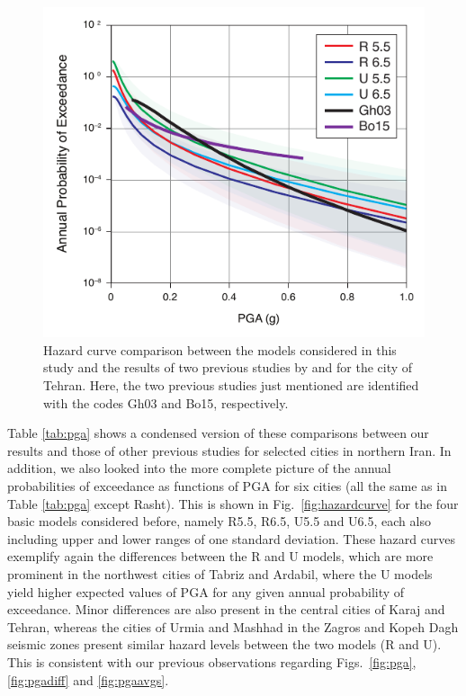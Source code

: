 \begin{figure}[t]
    \centering
    \includegraphics[width=\columnwidth]{figures/pdf/figure-13} 
    \caption{Hazard curve comparison between the models considered in this study and the results of two previous studies by \citet{Ghodrati2003} and \citet{Boostan2015} for the city of Tehran. Here, the two previous studies just mentioned are identified with the codes Gh03 and Bo15, respectively.}
    \label{fig:tehran}
\end{figure}

Table \ref{tab:pga} shows a condensed version of these comparisons between our results and those of other previous studies for selected cities in northern Iran. In addition, we also looked into the more complete picture of the annual probabilities of exceedance as functions of PGA for six cities (all the same as in Table \ref{tab:pga} except Rasht). This is shown in Fig.~\ref{fig:hazardcurve} for the four basic models considered before, namely R5.5, R6.5, U5.5 and U6.5, each also including upper and lower ranges of one standard deviation. These hazard curves exemplify again the differences between the R and U models, which are more prominent in the northwest cities of Tabriz and Ardabil, where the U models yield higher expected values of PGA for any given annual probability of exceedance. Minor differences are also present in the central cities of Karaj and Tehran, whereas the cities of Urmia and Mashhad in the Zagros and Kopeh Dagh seismic zones present similar hazard levels between the two models (R and U). This is consistent with our previous observations regarding Figs.~\ref{fig:pga}, \ref{fig:pgadiff} and \ref{fig:pgaavgs}.

